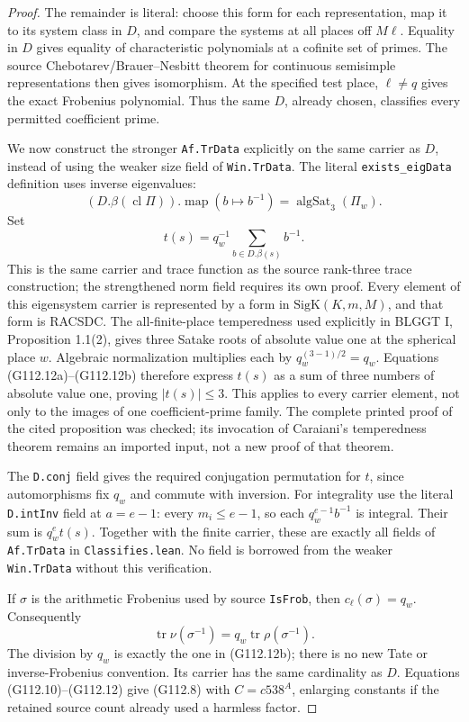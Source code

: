 \begin{proof}
The remainder is literal: choose this form for each representation,
map it to its system class in \(D\), and compare the systems at all
places off \(M\ell\).  Equality in \(D\) gives equality of
characteristic polynomials at a cofinite set of primes.  The source
Chebotarev/Brauer--Nesbitt theorem for continuous semisimple
representations then gives isomorphism.  At the specified test place,
\(\ell\ne q\) gives the exact Frobenius polynomial.  Thus the same
\(D\), already chosen, classifies every permitted coefficient prime.

We now construct the stronger \texttt{Af.TrData} explicitly on the
same carrier as \(D\), instead of using the weaker size field of
\texttt{Win.TrData}.  The literal \texttt{exists\_eigData} definition
uses inverse eigenvalues:
\[
  (D.\beta(\operatorname{cl}\Pi)).\operatorname{map}(b\mapsto b^{-1})
       =\operatorname{algSat}_3(\Pi_w).
       \tag{G112.12a}
\]
Set
\[
        t(s)=q_w^{-1}\sum_{b\in D.\beta(s)}b^{-1}.
        \tag{G112.12b}
\]
This is the same carrier and trace function as the source rank-three
trace construction; the strengthened norm field requires its own
proof.  Every element of this eigensystem carrier is represented by
a form in \(\mathrm{SigK}(K,m,M)\), and that form is RACSDC.  The
all-finite-place temperedness used explicitly in BLGGT I,
Proposition 1.1(2), gives three Satake roots of absolute value one
at the spherical place \(w\).  Algebraic normalization multiplies
each by \(q_w^{(3-1)/2}=q_w\).  Equations (G112.12a)--(G112.12b)
therefore express \(t(s)\) as a sum of three numbers of absolute
value one, proving \(|t(s)|\le3\).  This applies to every carrier
element, not only to the images of one coefficient-prime family.
The complete printed proof of the cited proposition was checked;
its invocation of Caraiani's temperedness theorem remains an imported
input, not a new proof of that theorem.

The \texttt{D.conj} field gives the required conjugation permutation
for \(t\), since automorphisms fix \(q_w\) and commute with inversion.
For integrality use the literal \texttt{D.intInv} field at \(a=e-1\):
every \(m_i\le e-1\), so each \(q_w^{e-1}b^{-1}\) is integral.
Their sum is \(q_w^e t(s)\).  Together with the finite carrier,
these are exactly all fields of \texttt{Af.TrData} in
\texttt{Classifies.lean}.  No field is borrowed from the weaker
\texttt{Win.TrData} without this verification.

If
\(\sigma\) is the arithmetic Frobenius used by source \texttt{IsFrob},
then \(c_\ell(\sigma)=q_w\).  Consequently
\[
 \operatorname{tr}\nu(\sigma^{-1})
      =q_w\operatorname{tr}\rho(\sigma^{-1}).
      \tag{G112.12}
\]
The division by \(q_w\) is exactly the one in (G112.12b);
there is no new Tate or inverse-Frobenius convention.  Its carrier has
the same cardinality as \(D\).  Equations (G112.10)--(G112.12) give
(G112.8) with \(C=c538^A\), enlarging constants if the retained
source count already used a harmless factor.


\end{proof}
